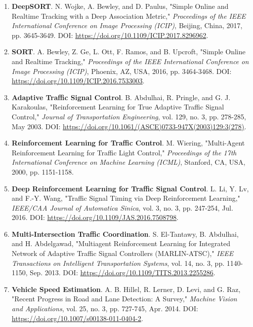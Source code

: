 \begin{enumerate}[resume]
    \item \textbf{DeepSORT}. N. Wojke, A. Bewley, and D. Paulus, "Simple Online and Realtime Tracking with a Deep Association Metric," 
    \textit{Proceedings of the IEEE International Conference on Image Processing (ICIP)}, 
    Beijing, China, 2017, pp. 3645-3649. DOI: \url{https://doi.org/10.1109/ICIP.2017.8296962}.
    
    \item \textbf{SORT}. A. Bewley, Z. Ge, L. Ott, F. Ramos, and B. Upcroft, "Simple Online and Realtime Tracking," 
    \textit{Proceedings of the IEEE International Conference on Image Processing (ICIP)}, 
    Phoenix, AZ, USA, 2016, pp. 3464-3468. DOI: \url{https://doi.org/10.1109/ICIP.2016.7533003}.
    
    \item \textbf{Adaptive Traffic Signal Control}. B. Abdulhai, R. Pringle, and G. J. Karakoulas, 
    "Reinforcement Learning for True Adaptive Traffic Signal Control," 
    \textit{Journal of Transportation Engineering}, vol. 129, no. 3, pp. 278-285, May 2003. 
    DOI: \url{https://doi.org/10.1061/(ASCE)0733-947X(2003)129:3(278)}.
    
    \item \textbf{Reinforcement Learning for Traffic Control}. M. Wiering, "Multi-Agent Reinforcement Learning for Traffic Light Control," 
    \textit{Proceedings of the 17th International Conference on Machine Learning (ICML)}, 
    Stanford, CA, USA, 2000, pp. 1151-1158.
    
    \item \textbf{Deep Reinforcement Learning for Traffic Signal Control}. L. Li, Y. Lv, and F.-Y. Wang, 
    "Traffic Signal Timing via Deep Reinforcement Learning," 
    \textit{IEEE/CAA Journal of Automatica Sinica}, vol. 3, no. 3, pp. 247-254, Jul. 2016. 
    DOI: \url{https://doi.org/10.1109/JAS.2016.7508798}.
    
    \item \textbf{Multi-Intersection Traffic Coordination}. S. El-Tantawy, B. Abdulhai, and H. Abdelgawad, 
    "Multiagent Reinforcement Learning for Integrated Network of Adaptive Traffic Signal Controllers (MARLIN-ATSC)," 
    \textit{IEEE Transactions on Intelligent Transportation Systems}, vol. 14, no. 3, pp. 1140-1150, Sep. 2013. 
    DOI: \url{https://doi.org/10.1109/TITS.2013.2255286}.
    
    \item \textbf{Vehicle Speed Estimation}. A. B. Hillel, R. Lerner, D. Levi, and G. Raz, 
    "Recent Progress in Road and Lane Detection: A Survey," 
    \textit{Machine Vision and Applications}, vol. 25, no. 3, pp. 727-745, Apr. 2014. 
    DOI: \url{https://doi.org/10.1007/s00138-011-0404-2}.
    

\end{enumerate}
